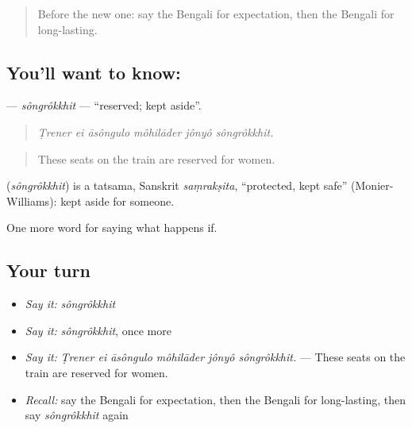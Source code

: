 \label{lesson:BN-C541-songrokkhit}



\begin{quote}
Before the new one: say the Bengali for expectation, then the Bengali for long-lasting.
\end{quote}

\subsection*{You'll want to know: }
\textbf{} — \emph{sôngrôkkhit} — \textquotedblleft{}reserved; kept aside\textquotedblright{}.

\begin{quote}
     
\end{quote}

\begin{quote}
\emph{Ṭrener ei āsôngulo môhilāder jônyô sôngrôkkhit.}
\end{quote}

\begin{quote}
These seats on the train are reserved for women.
\end{quote}

\begin{cousinweb}
\textbf{} (\emph{sôngrôkkhit}) is a tatsama, Sanskrit \emph{saṃrakṣita}, \textquotedblleft{}protected, kept safe\textquotedblright{} (Monier-Williams): kept aside for someone.
\end{cousinweb}

\begin{grammarlens}[title={What you've built}]
One more word for saying what happens if.
\end{grammarlens}

\subsection*{Your turn}
\begin{itemize}
\raggedright
  \item \emph{Say it:} \emph{sôngrôkkhit}
  \item \emph{Say it:} \emph{sôngrôkkhit}, once more
  \item \emph{Say it:} \emph{Ṭrener ei āsôngulo môhilāder jônyô sôngrôkkhit.} — These seats on the train are reserved for women.
  \item \emph{Recall:} say the Bengali for expectation, then the Bengali for long-lasting, then say \emph{sôngrôkkhit} again
\end{itemize}


